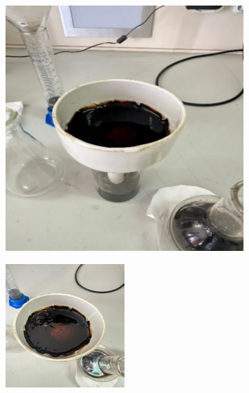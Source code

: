 \begin{figure}[H]
\begin{subfigure}[b]{0.32\textwidth}
    \end{subfigure}
    \begin{subfigure}[b]{0.32\textwidth}
        \centering
        \includegraphics[width=\textwidth, height=\textwidth]{media/gorn3/image6}
    \end{subfigure}
    \begin{subfigure}[b]{0.32\textwidth}
        \centering
        \includegraphics[width=\textwidth, height=\textwidth]{media/gorn3/image7}

\end{subfigure}
\end{figure}

